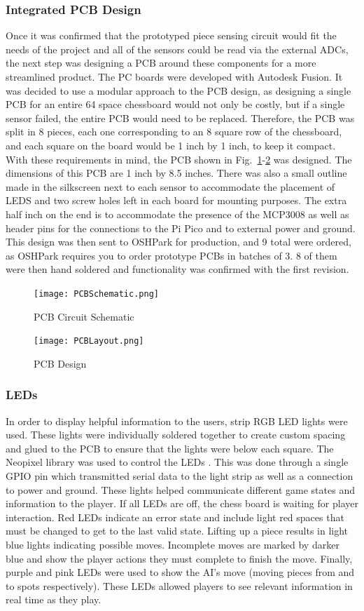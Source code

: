 \documentclass[11pt,journal]{IEEEtran}
\begin{document}
\subsubsection{Integrated PCB Design}
Once it was confirmed that the prototyped piece sensing circuit would fit the needs of the project and all of the sensors could be read via the external ADCs, the next step was designing a PCB around these components for a more streamlined product. The PC boards were developed with Autodesk Fusion. It was decided to use a modular approach to the PCB design, as designing a single PCB for an entire 64 space chessboard would not only be costly, but if a single sensor failed, the entire PCB would need to be replaced. Therefore, the PCB was split in 8 pieces, each one corresponding to an 8 square row of the chessboard, and each square on the board would be 1 inch by 1 inch, to keep it compact. With these requirements in mind, the PCB shown in Fig.~\ref{pcbschematic}-\ref{pcbdesign} was designed. The dimensions of this PCB are 1 inch by 8.5 inches. There was also a small outline made in the silkscreen next to each sensor to accommodate the placement of LEDS and two screw holes left in each board for mounting purposes. The extra half inch on the end is to accommodate the presence of the MCP3008 as well as header pins for the connections to the Pi Pico and to external power and ground. This design was then sent to OSHPark for production, and 9 total were ordered, as OSHPark requires you to order prototype PCBs in batches of 3. 8 of them were then hand soldered and functionality was confirmed with the first revision.
\begin{figure}[ht]
  \texttt{[image: PCBSchematic.png]}
  \caption{PCB Circuit Schematic}
  \label{pcbschematic}
\end{figure}
\begin{figure}[ht]
  \texttt{[image: PCBLayout.png]}
  \caption{PCB Design}
  \label{pcbdesign}
\end{figure}

\subsubsection{LEDs}
In order to display helpful information to the users, strip RGB LED lights were used. These lights were individually soldered together to create custom spacing and glued to the PCB to ensure that the lights were below each square. The Neopixel library was used to control the LEDs \cite{neopixel}. This was done through a single GPIO pin which transmitted serial data to the light strip as well as a connection to power and ground. These lights helped communicate different game states and information to the player. If all LEDs are off, the chess board is waiting for player interaction. Red LEDs indicate an error state and include light red spaces that must be changed to get to the last valid state. Lifting up a piece results in light blue lights indicating possible moves. Incomplete moves are marked by darker blue and show the player actions they must complete to finish the move. Finally, purple and pink LEDs were used to show the AI's move (moving pieces from and to spots respectively). These LEDs allowed players to see relevant information in real time as they play.
\end{document}
